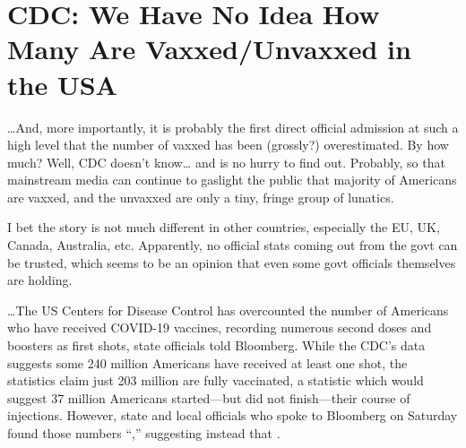 \chapter{CDC: We Have No Idea How Many Are Vaxxed/Unvaxxed in the USA}

\begin{refsection}

\dots{}And, more importantly, it is probably the first direct official admission at such a high level that the number of vaxxed has been (grossly?) overestimated. By how much? Well, CDC doesn't know\dots{} and is no hurry to find out. Probably, so that mainstream media can continue to gaslight the public that majority of Americans are vaxxed, and the unvaxxed are only a tiny, fringe group of lunatics.

I bet the story is not much different in other countries, especially the EU, UK, Canada, Australia, etc. Apparently, no official stats coming out from the govt can be trusted, which seems to be an opinion that even some govt officials themselves are holding.

\begin{tcolorbox}[quote]

\dots{}The US Centers for Disease Control has overcounted the number of Americans who have received COVID-19 vaccines, recording numerous second doses and boosters as first shots, state officials told Bloomberg. While the CDC's data suggests some 240 million Americans have received at least one shot, the statistics claim just 203 million are fully vaccinated, a statistic which would suggest 37 million Americans started---but did not finish---their course of injections. However, state and local officials who spoke to Bloomberg on Saturday found those numbers \enquote{,} suggesting instead that .\textsuperscript{\cite{url90ycv2k1}}

\end{tcolorbox}

\begin{tcolorbox}[quote]


\end{tcolorbox}
\end{refsection}
